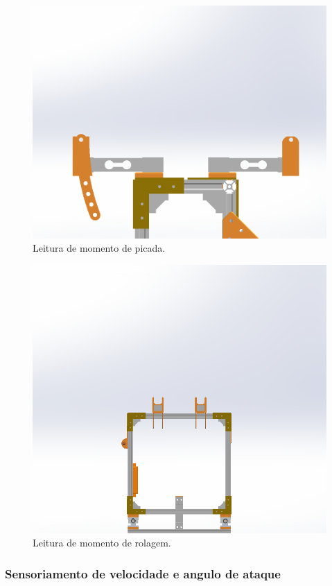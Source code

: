 \begin{figure}[!ht]
    \centering
    \includegraphics[width=.8\linewidth]{figuras/renders/esquematico_celulas_momento_pitch.png}
    \caption{Leitura de momento de picada\cite{autor}.}
    \label{fig:leitura_momento_pitch}
\end{figure}

\begin{figure}[!ht]
    \centering
    \includegraphics[width=.8\linewidth]{figuras/renders/esquematico_celulas_momento_roll.png}
    \caption{Leitura de momento de rolagem\cite{autor}.}
    \label{fig:leitura_momento_roll}
\end{figure}

\subsubsection{Sensoriamento de velocidade e angulo de ataque}

